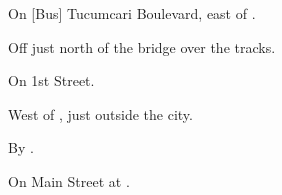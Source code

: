 

\begin{LocationList}

On [Bus] Tucumcari Boulevard, east of .

Off  just north of the bridge over the tracks.

On  1st Street.

West of , just outside the city.

\Location{\TruckStop \Gas \Rest \Weigh}
By  .

On  Main Street at .

\end{LocationList}
